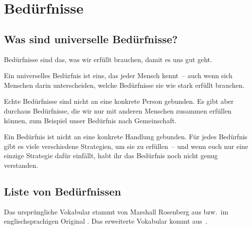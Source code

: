 \section{Bedürfnisse}
\label{beduerfnisse}

\subsection{Was sind universelle Bedürfnisse?}

Bedürfnisse sind das, was wir erfüllt brauchen, damit es uns gut geht.

Ein universelles Bedürfnis ist eins, das jeder Mensch kennt~-- auch wenn sich Menschen darin unterscheiden, welche Bedürfnisse sie wie stark erfüllt brauchen.

Echte Bedürfnisse sind nicht an eine konkrete Person gebunden. Es gibt aber durchaus Bedürfnisse, die wir nur mit anderen Menschen zusammen erfüllen können, zum Beispiel unser Bedürfnis nach Gemeinschaft.

Ein Bedürfnis ist nicht an eine konkrete Handlung gebunden. Für jedes Bedürfnis gibt es viele verschiedene Strategien, um sie zu erfüllen~-- und wenn euch nur eine einzige Strategie dafür einfällt, habt ihr das Bedürfnis noch nicht genug verstanden.

\subsection{Liste von Bedürfnissen}
\label{beduerfnisse-liste}

Das ursprüngliche Vokabular stammt von Marshall Rosenberg aus \cite[S.~216~f]{gfk-rosenberg} bzw.~im englischsprachigen Original \cite[S.~210]{nvc-rosenberg}. Das erweiterte Vokabular kommt aus~\cite[S.~75~f]{gfk-dummies}.

